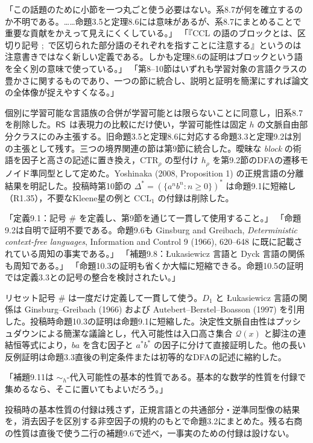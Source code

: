 「この話題のために小節を一つ丸ごと使う必要はない。系8.7が何を確立するのか不明である。……命題3.5と定理8.6には意味があるが、系8.7にまとめることで重要な貢献をかえって見えにくくしている。」
「『CCL の語のブロックとは、区切り記号 $;$ で区切られた部分語のそれぞれを指すことに注意する』というのは注意書きではなく新しい定義である。しかも定理8.6の証明はブロックという語を全く別の意味で使っている。」
「第8--10節はいずれも学習対象の言語クラスの豊かさに関するものであり、一つの節に統合し、説明と証明を簡潔にすれば論文の全体像が捉えやすくなる。」

\Reply
個別に学習可能な言語族の合併が学習可能とは限らないことに同意し，旧系8.7を削除した。$\mathsf{RS}$ は表現力の比較にだけ使い，学習可能性は固定 $h$ の文脈自由部分クラスにのみ主張する。旧命題3.5と定理8.6に対応する命題3.3と定理9.2は別の主張として残す。三つの境界関連の節は第9節に統合した。曖昧な \emph{block} の術語を因子と高さの記述に置き換え，$\mathrm{CTR}_\rho$ の型付け $h_\rho$ を第9.2節のDFAの遷移モノイド準同型として定めた。Yoshinaka (2008, Proposition 1) の正規言語の分離結果を明記した。投稿時第10節の $\Delta^*=(\{a^nb^n:n\ge0\})^*$ は命題9.1に短縮し（R1.35），不要なKleene星の例と $\mathrm{CCL}_1$ の付録は削除した。

「定義9.1：記号 $\#$ を定義し、第9節を通じて一貫して使用すること。」
「命題9.2は自明で証明不要である。命題9.6も Ginsburg and Greibach, \emph{Deterministic context-free languages}, Information and Control 9 (1966), 620--648 に既に記載されている周知の事実である。」
「補題9.8：Łukasiewicz 言語と Dyck 言語の関係も周知である。」
「命題10.3の証明も省くか大幅に短縮できる。命題10.5の証明では定義3.3との記号の整合を検討されたい。」

\Reply
リセット記号 $\#$ は一度だけ定義して一貫して使う。$D_1$ と Łukasiewicz 言語の関係は Ginsburg--Greibach (1966) および Autebert--Berstel--Boasson (1997) を引用した。投稿時命題10.3の証明は命題9.1に短縮した。決定性文脈自由性はプッシュダウンによる簡潔な議論とし，代入可能性は入口高さ集合 $\mathcal Q(x)$ と脚注の連結恒等式により，$ba$ を含む因子と $a^*b^*$ の因子に分けて直接証明した。他の長い反例証明は命題3.3直後の判定条件または初等的なDFAの記述に縮約した。

「補題9.11は $\sim_h$-代入可能性の基本的性質である。基本的な数学的性質を付録で集めるなら、そこに置いてもよいだろう。」

\Reply
投稿時の基本性質の付録は残さず，正規言語との共通部分・逆準同型像の結果を，消去因子を区別する非空因子の規約のもとで命題3.2にまとめた。残る右商の性質は直後で使う二行の補題9.6で述べ，一事実のための付録は設けない。

